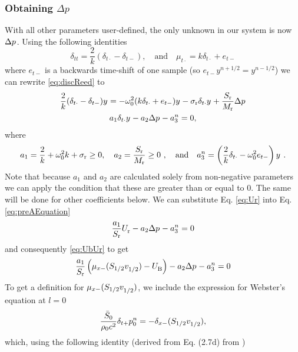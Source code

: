\documentclass[dvipsnames]{article}
\begin{document}
\subsubsection{Obtaining $\Delta p$}\label{sec:obtainingDeltaP}
With all other parameters user-defined, the only unknown in our system is now $\Delta p^{}$. Using the following identities
\begin{equation}
    \delta_{tt} = \frac{2}{k}(\delta_{t\cdot} - \delta_{t-}), \quad \text{and} \quad \mu_{t\cdot} = k\delta_{t\cdot} + e_{t-}
\end{equation}
where $e_{t-}$ is a backwards time-shift of one sample (so $e_{t-}y^{n+1/2} = y^{n-1/2}$) we can rewrite \eqref{eq:discReed} to
\begin{gather}
    \frac{2}{k} (\delta_{t\cdot} - \delta_{t-})y^{} = -\omega_0^2(k\delta_{t\cdot} + e_{t-})y^{} - \sigma_\text{r}\delta_{t\cdot} y^{} + \frac{S_\text{r}}{M_\text{r}}\Delta p^{}\nonumber\\
    a_1\delta_{t\cdot}y^{} - a_2\Delta p^{} - a_3^n = 0,\label{eq:preAEquation}
\end{gather}
where
\begin{equation}\label{eq:aCoeffs}
    a_1 = \frac{2}{k} + \omega_0^2k + \sigma_\text{r} \geq 0, \quad a_2 = \frac{S_\text{r}}{M_\text{r}} \geq 0\ , \quad \text{and} \quad a_3^n = \left(\frac{2}{k} \delta_{t\cdot} - \omega_0^2e_{t-}\right)y^{\nph}\ .
\end{equation}
Note that because $a_1$ and $a_2$ are calculated solely from non-negative parameters we can apply the condition that these are greater than or equal to 0. The same will be done for other coefficients below.
We can substitute Eq. \eqref{eq:Ur} into Eq. \eqref{eq:preAEquation}
\begin{equation}
    \frac{a_1}{S_\text{r}}U_\text{r}^{} - a_2 \Delta p^{} - a_3^n = 0
\end{equation}
and consequently \eqref{eq:UbUr} to get
\begin{equation}\label{eq:aEquation}
    \frac{a_1}{S_\text{r}}\left(\mu_{x-}(S_{1/2}v_{1/2}^{}) - U_\text{B}^{}\right) - a_2 \Delta p^{} - a_3^n = 0
\end{equation}
%
To get a definition for $\mu_{x-}(S_{1/2}v_{1/2}^{})$, we include the expression for Webster's equation at $l=0$
\begin{equation}
    \frac{\bar S_0}{\rho_0 c^2}\delta_{t+}p_0^n = -\delta_{x-}(S_{1/2}v_{1/2}^{}),
\end{equation}
which, using the following identity (derived from Eq. (2.7d) from \cite{Bilbao2009})
\end{document}
